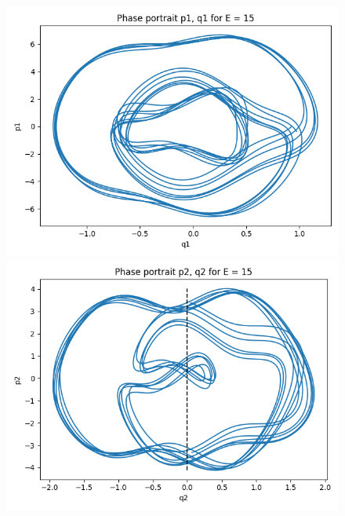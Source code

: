 \documentclass[a4paper,12pt]{article}
\begin{document}
\begin{figure}[!ht]
  \centering
  \begin{minipage}{0.45\textwidth}
    \includegraphics[width=\textwidth]{img/5-p1q1-15.png}
  \end{minipage}
  \begin{minipage}{0.45\textwidth}
    \includegraphics[width=\textwidth]{img/5-p2q2-15.png}
  \end{minipage}
\end{figure}
\end{document}
